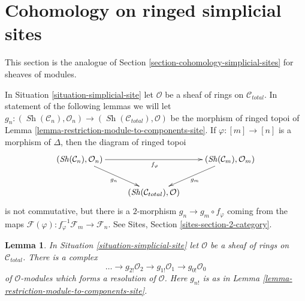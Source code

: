 \documentclass{stacks-project}
\theoremstyle{plain}
\newtheorem{lemma}[subsection]{Lemma}
\theoremstyle{definition}
\theoremstyle{remark}
\numberwithin{equation}{subsection}
\def\Sh{\mathop{\mathit{Sh}}\nolimits}
\begin{document}
\section{Cohomology on ringed simplicial sites}
\label{section-cohomology-simplicial-sites-modules}

\noindent
This section is the analogue of
Section \ref{section-cohomology-simplicial-sites}
for sheaves of modules.

\medskip\noindent
In Situation \ref{situation-simplicial-site} let $\mathcal{O}$
be a sheaf of rings on $\mathcal{C}_{total}$.
In statement of the following lemmas we will let
$g_n : (\Sh(\mathcal{C}_n), \mathcal{O}_n) \to
(\Sh(\mathcal{C}_{total}), \mathcal{O})$
be the morphism of ringed topoi of
Lemma \ref{lemma-restriction-module-to-components-site}.
If $\varphi : [m] \to [n]$ is a morphism of $\Delta$, then the diagram
of ringed topoi
$$
\xymatrix{
(\Sh(\mathcal{C}_n), \mathcal{O}_n) \ar[rd]_{g_n} \ar[rr]_{f_\varphi} & &
(\Sh(\mathcal{C}_m), \mathcal{O}_m) \ar[ld]^{g_m} \\
& (\Sh(\mathcal{C}_{total}), \mathcal{O})
}
$$
is not commutative, but there is a $2$-morphism $g_n \to g_m \circ f_\varphi$
coming from the maps
$\mathcal{F}(\varphi) : f_\varphi^{-1}\mathcal{F}_m \to \mathcal{F}_n$.
See Sites, Section \ref{sites-section-2-category}.

\begin{lemma}
\label{lemma-simplicial-resolution-ringed}
In Situation \ref{situation-simplicial-site} let $\mathcal{O}$
be a sheaf of rings on $\mathcal{C}_{total}$. There is a complex
$$
\ldots \to g_{2!}\mathcal{O}_2 \to g_{1!}\mathcal{O}_1 \to g_{0!}\mathcal{O}_0
$$
of $\mathcal{O}$-modules which forms a resolution of
$\mathcal{O}$.
Here $g_{n!}$ is as in Lemma \ref{lemma-restriction-module-to-components-site}.
\end{lemma}
\end{document}
